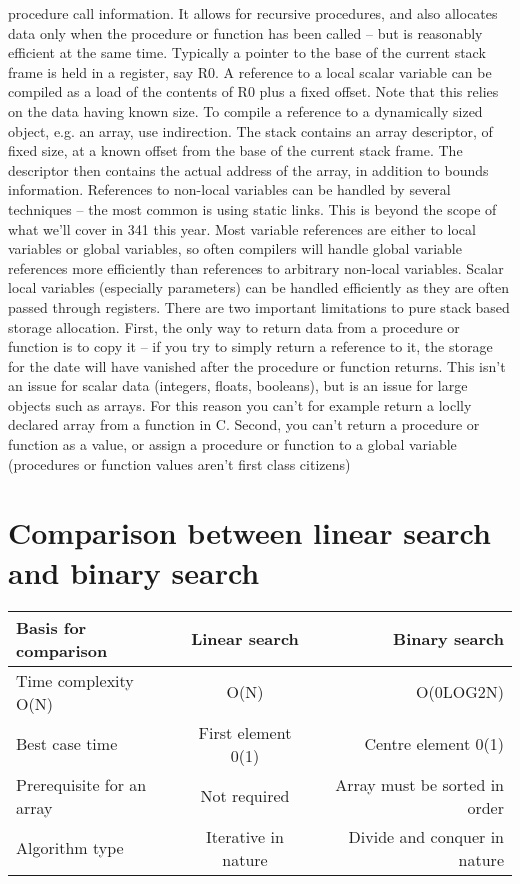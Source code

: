 \documentclass{article}
\begin{document}
procedure call information. It allows for recursive procedures, and also allocates data only when the 
procedure or function has been called -- but is 
reasonably efficient at the same time. Typically a 
pointer to the base of the current stack frame is held in 
a register, say R0. A reference to a local scalar 
variable can be compiled as a load of the contents of 
R0 plus a fixed offset. Note that this relies on the data 
having known size. To compile a reference to a 
dynamically sized object, e.g. an array, use 
indirection. The stack contains an array descriptor, of 
fixed size, at a known offset from the base of the 
current stack frame. The descriptor then contains the 
actual address of the array, in addition to bounds 
information. References to non-local variables can be 
handled by several techniques -- the most common is 
using static links. This is beyond the scope of what 
we'll cover in 341 this year. Most variable references 
are either to local variables or global variables, so 
often compilers will handle global variable references 
more efficiently than references to arbitrary non-local 
variables. Scalar local variables (especially 
parameters) can be handled efficiently as they are 
often passed through registers. 
There are two important limitations to pure stackbased storage allocation.
First, the only way to return data from a procedure or 
function is to copy it -- if you try to simply return a 
reference to it, the storage for the date will have 
vanished after the procedure or function returns. This 
isn't an issue for scalar data (integers, floats, 
booleans), but is an issue for large objects such as 
arrays. For this reason you can't for example return a 
loclly declared array from a function in C. Second, 
you can't return a procedure or function as a value, or 
assign a procedure or function to a global variable 
(procedures or function values aren't first class 
citizens)

\section{Comparison between linear search and binary search}
\begin{center}  
\begin{tabular}{|l|c|r|}  
\hline 
Basis for comparison& Linear search& Binary search\\
\hline
Time complexity O(N)&O(N)&O(0LOG2N)\\
\hline

Best case time & First element 0(1) & Centre element 0(1)\\
\hline
Prerequisite for an array &  Not required & Array must be sorted in order\\
\hline
Algorithm type & Iterative in nature & Divide and conquer in nature\\
\hline



\end{tabular}
\end{center}
\end{document}
